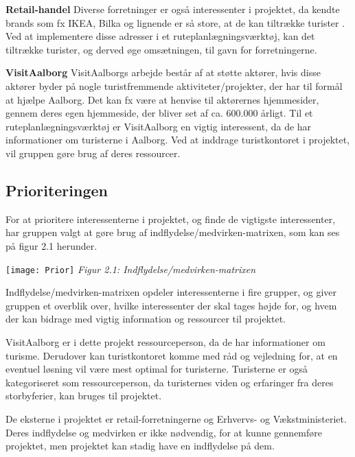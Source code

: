 \textbf{Retail-handel}\newline
Diverse forretninger er også interessenter i projektet, da kendte brands som fx IKEA, Bilka og lignende er så store, at de kan tiltrække turister \citep{PengeloseButikker}. Ved at implementere disse adresser i et ruteplanlægningsværktøj, kan det tiltrække turister, og derved øge omsætningen, til gavn for forretningerne.

\textbf{VisitAalborg}\newline
VisitAalborgs arbejde består af at støtte aktører, hvis disse aktører byder på nogle turistfremmende aktiviteter/projekter, der har til formål at hjælpe Aalborg. Det kan fx være at henvise til aktørernes hjemmesider, gennem deres egen hjemmeside, der bliver set af ca. 600.000 årligt. \citep{VA}
Til et ruteplanlægningsværktøj er VisitAalborg en vigtig interessent, da de har informationer om turisterne i Aalborg. Ved at inddrage turistkontoret i projektet, vil gruppen gøre brug af deres ressourcer. 

\subsection{Prioriteringen}
For at prioritere interessenterne i projektet, og finde de vigtigste interessenter, har gruppen valgt at gøre brug af indflydelse/medvirken-matrixen, som kan ses på figur 2.1 herunder.

\texttt{[image: Prior]}
\textit{Figur 2.1: Indflydelse/medvirken-matrixen}\newline

Indflydelse/medvirken-matrixen opdeler interessenterne i fire grupper, og giver gruppen et overblik over, hvilke interessenter der skal tages højde for, og hvem der kan bidrage med vigtig information og ressourcer til projektet.

VisitAalborg er i dette projekt ressourceperson, da de har informationer om turisme. Derudover kan turistkontoret komme med råd og vejledning for, at en eventuel løsning vil være mest optimal for turisterne.   \newline
Turisterne er også kategoriseret som ressourceperson, da turisternes viden og erfaringer fra deres storbyferier, kan bruges til projektet.

De eksterne i projektet er retail-forretningerne og Erhvervs- og Vækstministeriet. Deres indflydelse og medvirken er ikke nødvendig, for at kunne gennemføre projektet, men projektet kan stadig have en indflydelse på dem.

